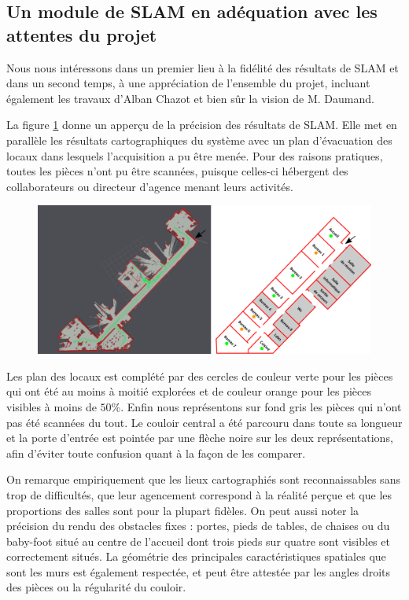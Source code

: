   \subsection{Un module de SLAM en adéquation avec les attentes du projet}
  
  Nous nous intéressons dans un premier lieu à la fidélité des résultats de SLAM et dans un second temps, à une appréciation de l'ensemble du projet, incluant également les travaux d'Alban Chazot et bien sûr la vision de M. Daumand.  
  
  La figure \ref{fig:carto} donne un apperçu de la précision des résultats de SLAM. 
  Elle met en parallèle les résultats cartographiques du système avec un plan d'évacuation des locaux dans lesquels l'acquisition a pu être menée. 
  Pour des raisons pratiques, toutes les pièces n'ont pu être scannées, puisque celles-ci hébergent des collaborateurs ou directeur d'agence menant leurs activités.
  
  \begin{figure}[h]
    \centering
      \includegraphics[width=1.\linewidth]{figures/plan}  
    \label{fig:carto}
  \end{figure}
  
  Les plan des locaux est complété par des cercles de couleur verte pour les pièces qui ont été au moins à moitié explorées et de couleur orange pour les pièces visibles à moins de $50\%$. 
  Enfin nous représentons sur fond gris les pièces qui n'ont pas été scannées du tout. 
  Le couloir central a été parcouru dans toute sa longueur et la porte d'entrée est pointée par une flèche noire sur les deux représentations, afin d'éviter toute confusion quant à la façon de les comparer. 
  
  On remarque empiriquement que les lieux cartographiés sont reconnaissables sans trop de difficultés, que leur agencement correspond à la réalité perçue et que les proportions des salles sont pour la plupart fidèles. 
  On peut aussi noter la précision du rendu des obstacles fixes : portes, pieds de tables, de chaises ou du baby-foot situé au centre de l'accueil dont trois pieds sur quatre sont visibles et correctement situés. 
  La géométrie des principales caractéristiques spatiales que sont les murs est également respectée, et peut être attestée par les angles droits des pièces ou la régularité du couloir. 
  
